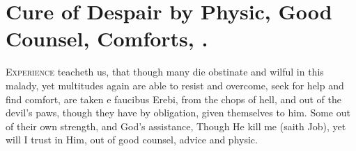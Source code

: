 {%
\section[Cure of Despair]{Cure of Despair by Physic, Good Counsel, Comforts, \etc{}.}

\lettrine{E}{xperience} teacheth us, that though many die obstinate and wilful in
this malady, yet multitudes again are able to resist and overcome, seek
for help and find comfort, are taken e faucibus Erebi, from the chops
of hell, and out of the devil's paws, though they have by
obligation, given themselves to him. Some out of their own
strength, and God's assistance, Though He kill me (saith Job), yet
will I trust in Him, out of good counsel, advice and physic.

}
